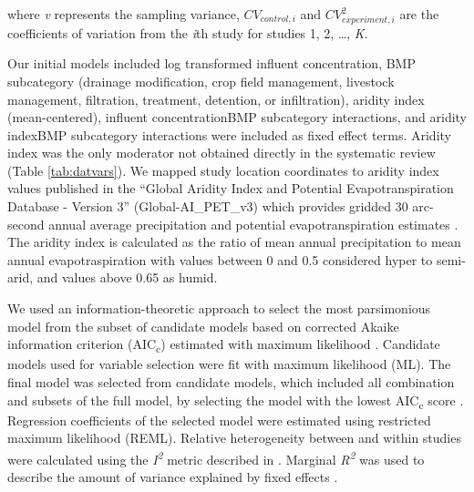 \documentclass[utf8]{FrontiersinHarvard}
\begin{document}
where \emph{v} represents the sampling variance, \(CV_{control,i}\) and \(CV^2_{experiment,i}\) are the coefficients of variation from the \emph{i}th study for studies 1, 2, \ldots, \emph{K}.

Our initial models included log transformed influent concentration, BMP subcategory (drainage modification, crop field management, livestock management, filtration, treatment, detention, or infiltration), aridity index (mean-centered), influent concentration\texttimes BMP subcategory interactions, and aridity index\texttimes BMP subcategory interactions were included as fixed effect terms.
Aridity index was the only moderator not obtained directly in the systematic review (Table \ref{tab:datvars}).
We mapped study location coordinates to aridity index values published in the ``Global Aridity Index and Potential Evapotranspiration Database - Version 3'' (Global-AI\_PET\_v3) which provides gridded 30 arc-second annual average precipitation and potential evapotranspiration estimates \citep{zomerVersionGlobalAridity2022}.
The aridity index is calculated as the ratio of mean annual precipitation to mean annual evapotraspiration with values between 0 and 0.5 considered hyper to semi-arid, and values above 0.65 as humid.

We used an information-theoretic approach to select the most parsimonious model from the subset of candidate models based on corrected Akaike information criterion (AIC\textsubscript{c}) estimated with maximum likelihood \citep{cinarUsingInformationTheoretic2021}.
Candidate models used for variable selection were fit with maximum likelihood (ML).
The final model was selected from candidate models, which included all combination and subsets of the full model, by selecting the model with the lowest AIC\textsubscript{c} score \citep{burnhamAICModelSelection2011, cinarUsingInformationTheoretic2021}.
Regression coefficients of the selected model were estimated using restricted maximum likelihood (REML).
Relative heterogeneity between and within studies were calculated using the \emph{I\textsuperscript{2}} metric described in \citet{nakagawaMethodologicalIssuesAdvances2012}.
Marginal \emph{R\textsuperscript{2}} was used to describe the amount of variance explained by fixed effects \citep{nakagawaGeneralSimpleMethod2013}.
\end{document}
